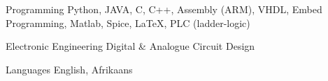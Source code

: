 

\begin{cvskills}


%

  \cvskill
    {Programming} %
    {Python, JAVA, C, C++, Assembly (ARM), VHDL, Embed Programming, Matlab, Spice, LaTeX, PLC (ladder-logic)} %

\cvskill
{Electronic Engineering} %
{Digital \& Analogue Circuit Design} %


  \cvskill
    {Languages} %
    {English, Afrikaans} %
    


\end{cvskills}
